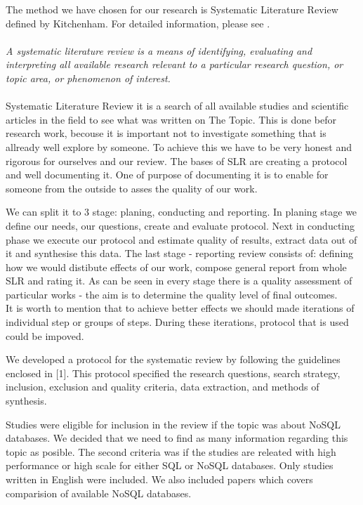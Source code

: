 \documentclass[times, 10pt,twocolumn]{article}
\begin{document}
The method we have chosen for our research is Systematic Literature Review defined by Kitchenham. For detailed information, please see \cite{kitchenham}. 
~\\
~\\
\emph {A systematic literature review is a means of identifying, evaluating and interpreting all available research relevant to a particular 
research question, or topic area, or phenomenon of interest.} \cite[p.~3]{kitchenham}
~\\
~\\
Systematic Literature Review it is a search of all available studies and scientific articles in the field to see what was written on The Topic. 
This is done befor research work, becouse it is important not to investigate something that is allready well explore by someone. To achieve this 
we have to be very honest and rigorous for ourselves and our review. The bases of SLR are creating a protocol and well documenting it. One of 
purpose of documenting it is to enable for someone from the outside to asses the quality of our work. 

We can split it to 3 stage: planing, conducting and reporting. In planing stage we define our needs, our questions, create and evaluate 
protocol. Next in conducting phase we execute our protocol and estimate quality of results, extract data out of it and synthesise this 
data. The last stage - reporting review consists of: defining how we would distibute effects of our work, compose general report from whole 
SLR and rating it. As can be seen in every stage there is a quality assessment of particular works - the aim is to determine the quality level of final outcomes.
~\\
It is worth to mention that to achieve better effects we should made iterations of individual step or groups of steps. During these iterations, protocol that is used could be impoved.


We developed a protocol for the systematic review by following the guidelines enclosed in [1]. This protocol specified the research questions, search
strategy, inclusion, exclusion and quality criteria, data extraction, and methods of synthesis.



Studies were eligible for inclusion in the review if the topic was about NoSQL databases. We decided that we need to find as many information regarding this topic as posible.
The second criteria was if the studies are releated with high performance or high scale for either SQL or NoSQL databases. Only studies written in English were included.
We also included papers which covers comparision of available NoSQL databases.
\end{document}
